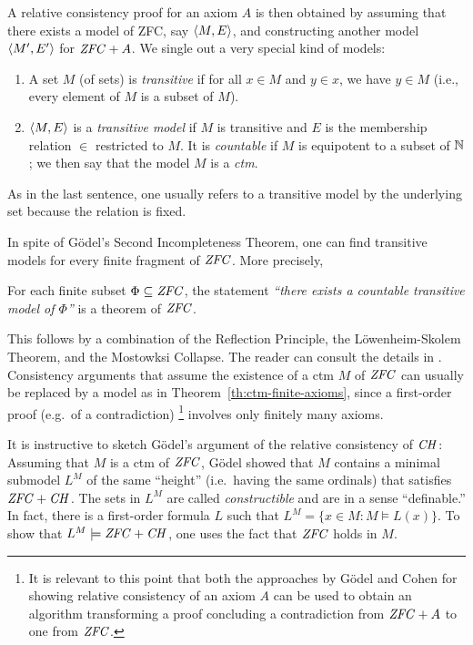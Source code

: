 A relative consistency proof for an axiom $A$ is then obtained by
assuming that there exists a model of ZFC, say $\langle M,E\rangle$, and
constructing another model $\langle M',E'\rangle$ for $\mathit{ZFC} + A$. We single
out a very special kind of models:
%
\begin{definition}\label{def:transitive-model}
  \begin{enumerate}
  \item A set $M$ (of sets) is \emph{transitive} if for all $x\in M$ and 
    $y\in x$, we have $y\in M$ (i.e., every element of $M$ is a subset
    of $M$).
  \item $\langle M,E\rangle$ is a \emph{transitive model} if $M$ is transitive
     and  $E$ is the membership relation $\in$ restricted to
    $M$. It is \emph{countable} if $M$ is equipotent to a subset of
    $\mathbb{N}$; we then say that the model  $M$ is a \emph{ctm}. 
  \end{enumerate}
\end{definition}
%
\noindent As in the last sentence, one usually refers to a transitive
model by the underlying set because the relation is fixed.

In spite of G\"odel's Second Incompleteness Theorem, one can find
transitive models for every finite fragment of $\mathit{ZFC}$. More precisely,
%
\begin{theorem}\label{th:ctm-finite-axioms}
  For each finite subset
  $\Phi\subseteq \mathit{ZFC}$, the statement \emph{``there exists a countable
    transitive model of $\Phi$''} is a theorem of $\mathit{ZFC}$.
\end{theorem}
%
\noindent This follows by a combination of the Reflection Principle, the
L\"owenheim-Skolem Theorem, and the Mostowksi Collapse. The reader can
consult the details in \cite{kunen2011set}. Consistency arguments that
assume the existence of a ctm $M$ of $\mathit{ZFC}$ can usually be replaced by
a model as in Theorem~\ref{th:ctm-finite-axioms}, since a first-order
proof (e.g.\ of a contradiction)%
\footnote{It is relevant to this point that 
  both the approaches by G\"odel and Cohen for showing
  relative consistency of an axiom $A$ 
  can be used to obtain an algorithm transforming a proof
  concluding a contradiction from $\mathit{ZFC}+A$ to one from $\mathit{ZFC}$.}
involves only finitely many axioms.

It is instructive to sketch G\"odel's argument of the relative
consistency of $\mathit{CH}$: Assuming that $M$ is a ctm of $\mathit{ZFC}$, G\"odel
showed that $M$ contains a minimal submodel $L^M$ of the same
``height'' (i.e.\ having the same ordinals) that satisfies
$\mathit{ZFC}+\mathit{CH}$. The sets in $L^M$ are called \emph{constructible} and are
in a sense ``definable.'' In fact, there is a first-order formula $L$
such that $L^M = \{x\in M : M\models L(x)\}$. To show that
$L^M\models \mathit{ZFC}+\mathit{CH}$, one uses the fact that $\mathit{ZFC}$ holds in $M$.

